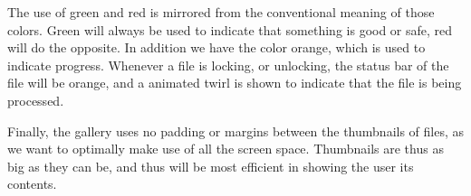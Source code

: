 The use of green and red is mirrored from the conventional meaning of those colors. Green 
will always be used to indicate that something is good or safe, red will do the opposite. 
In addition we have the color orange, which is used to indicate progress. Whenever a file is 
locking, or unlocking, the status bar of the file will be orange, and a animated twirl is shown 
to indicate that the file is being processed. %

Finally, the gallery uses no padding or margins between the thumbnails of files, as we want 
to optimally make use of all the screen space. Thumbnails are thus as big as they can be, 
and thus will be most efficient in showing the user its contents. 

